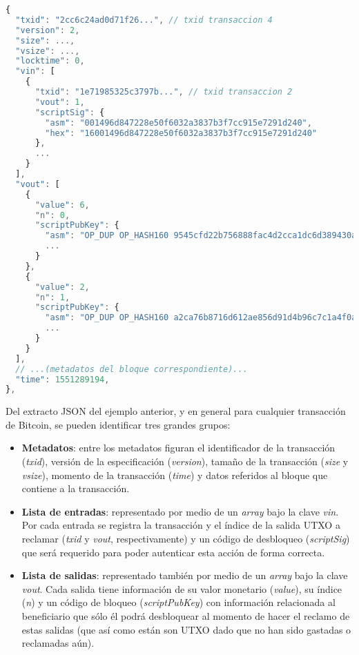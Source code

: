 \begin{minipage}{\linewidth}
\begin{lstlisting}[frame=single, belowskip=1em, aboveskip=2em,  language=javascript, captionpos=b, caption=Estructura JSON de una transacción en Bitcoin, label={lst:estructura_transaccion}]
{
  "txid": "2cc6c24ad0d71f26...", // txid transaccion 4
  "version": 2,
  "size": ...,
  "vsize": ...,
  "locktime": 0,
  "vin": [
    {
      "txid": "1e71985325c3797b...", // txid transaccion 2
      "vout": 1,
      "scriptSig": {
        "asm": "001496d847228e50f6032a3837b3f7cc915e7291d240",
        "hex": "16001496d847228e50f6032a3837b3f7cc915e7291d240"
      },
      ...
    }
  ],
  "vout": [
    {
      "value": 6,
      "n": 0,
      "scriptPubKey": {
        "asm": "OP_DUP OP_HASH160 9545cfd22b756888fac4d2cca1dc6d389430acf2 OP_EQUALVERIFY OP_CHECKSIG",
        ...
      }
    },
    {
      "value": 2,
      "n": 1,
      "scriptPubKey": {
        "asm": "OP_DUP OP_HASH160 a2ca76b8716d612ae856d91d4b96c7c1a4f0a150 OP_EQUALVERIFY OP_CHECKSIG",
        ...
      }
    }
  ],
  // ...(metadatos del bloque correspondiente)...
  "time": 1551289194,
},
\end{lstlisting}
\end{minipage}

Del extracto JSON del ejemplo anterior, y en general para cualquier transacción de Bitcoin, se pueden identificar tres grandes grupos:

\begin{itemize}
  \item \textbf{Metadatos}: entre los metadatos figuran el identificador de la transacción (\textit{txid}), versión de la especificación (\textit{version}), tamaño de la transacción (\textit{size} y \textit{vsize}), momento de la transacción (\textit{time}) y datos referidos al bloque que contiene a la transacción.
  \item \textbf{Lista de entradas}: representado por medio de un \textit{array} bajo la clave \textit{vin}. Por cada entrada se registra la transacción y el índice de la salida UTXO a reclamar (\textit{txid} y \textit{vout}, respectivamente) y un código de desbloqueo (\textit{scriptSig}) que será requerido para poder autenticar esta acción de forma correcta.
  \item \textbf{Lista de salidas}: representado también por medio de un \textit{array} bajo la clave \textit{vout}. Cada salida tiene información de su valor monetario (\textit{value}), su índice (\textit{n}) y un código de bloqueo (\textit{scriptPubKey}) con información relacionada al beneficiario que sólo él podrá desbloquear al momento de hacer el reclamo de estas salidas (que así como están son UTXO dado que no han sido gastadas o reclamadas aún).
\end{itemize}

